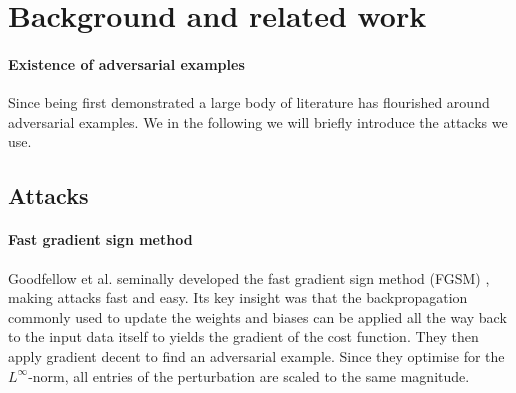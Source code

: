 \documentclass{article}
\newcommand{\defneq}{\mathrel{\mathop:}=}
\begin{document}
\section{Background and related work}

\paragraph{Existence of adversarial examples}
Since being first demonstrated \cite{Szegedy13} a large body of literature has flourished around adversarial examples. We in the following we will briefly introduce the attacks we use.

%
%
%
%
%

\subsection{Attacks}
\label{subsec:attacks}
\paragraph{Fast gradient sign method}
Goodfellow et al. seminally developed the fast gradient sign method (FGSM) \cite{goodfellow2014explaining}, making attacks fast and easy. Its key insight was that the backpropagation commonly used to update the weights and biases can be applied all the way back to the input data itself to yields the gradient of the cost function. They then apply gradient decent to find an adversarial example. Since they optimise for the $L^\infty$-norm, all entries of the perturbation are scaled to the same magnitude.
\end{document}

